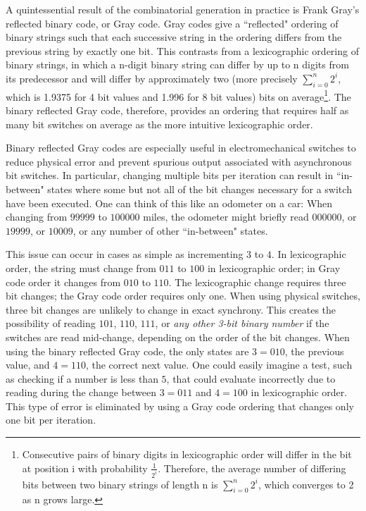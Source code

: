 A quintessential result of the combinatorial generation in practice is Frank Gray's reflected binary code, or Gray code. Gray codes give a ``reflected" ordering of binary strings such that each successive string in the ordering differs from the previous string by exactly one bit. This contrasts from a lexicographic ordering of binary strings, in which a n-digit binary string can differ by up to n digits from its predecessor and will differ by approximately two (more precisely $\sum_{i=0}^n2^i$, which is 1.9375 for 4 bit values and 1.996 for 8 bit values) bits on average\footnote{Consecutive pairs of binary digits in lexicographic order will differ in the bit at position i with probability $\frac{1}{2^i}$.  Therefore, the average number of differing bits between two binary strings of length n is $\sum_{i=0}^n2^i$, which converges to 2 as n grows large.}. The binary reflected Gray code, therefore, provides an ordering that requires half as many bit switches on average as the more intuitive lexicographic order. 



Binary reflected Gray codes are especially useful in electromechanical switches to reduce physical error and prevent spurious output associated with asynchronous bit switches.  In particular, changing multiple bits per iteration can result in ``in-between" states where some but not all of the bit changes necessary for a switch have been executed.  One can think of this like an odometer on a car: When changing from $99999$ to $100000$ miles, the odometer might briefly read $000000$, or $19999$, or $10009$, or any number of other ``in-between" states. 

This issue can occur in cases as simple as incrementing $3$ to $4$.  In lexicographic order, the string must change from $011$ to $100$ in lexicographic order; in Gray code order it changes from $010$ to $110$.  The lexicographic change requires three bit changes; the Gray code order requires only one.  When using physical switches, three bit changes are unlikely to change in exact synchrony.  This creates the possibility of reading $101$, $110$, $111$, or \emph{any other 3-bit binary number} if the switches are read mid-change, depending on the order of the bit changes.  When using the binary reflected Gray code, the only states are $3=010$, the previous value, and $4=110$, the correct next value. One could easily imagine a test, such as checking if a number is less than $5$, that could evaluate incorrectly due to reading during the change between $3=011$ and $4=100$ in lexicographic order.  This type of error is eliminated by using a Gray code ordering that changes only one bit per iteration.

